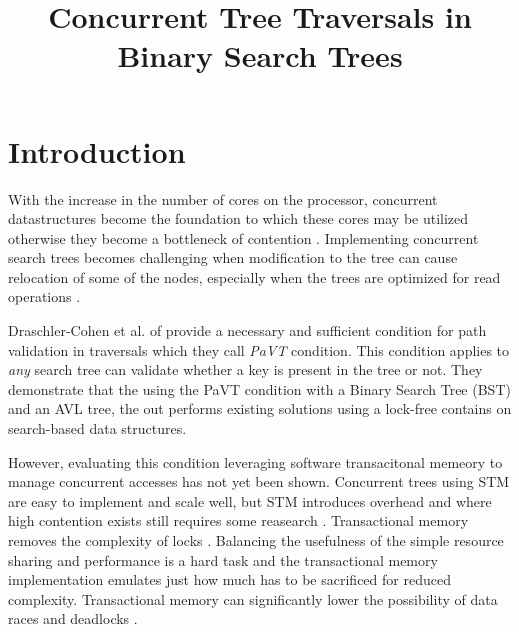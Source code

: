 \documentclass[conference]{IEEEtran}
\theoremstyle{definition}
\theoremstyle{theorem}
\begin{document}
\title{Concurrent Tree Traversals in Binary Search Trees\\
}

\author{
\and
{}
}

\maketitle

\begin{abstract}

\end{abstract}

\section{Introduction}
With the increase in the number of cores on the processor, concurrent datastructures become the foundation to which these cores may be utilized otherwise they become a bottleneck of contention \cite{crain-cont}. Implementing concurrent search trees becomes challenging when modification to the tree can cause relocation of some of the nodes, especially when the trees are optimized for read operations \cite{pavt}.

Draschler-Cohen et al. of \cite{pavt} provide a necessary and sufficient condition for path validation in traversals which they call \textit{PaVT} condition. This condition applies to \textit{any} search tree can validate whether a key is present in the tree or not. They demonstrate that the using the PaVT condition with a Binary Search Tree (BST) and an AVL tree, the out performs existing solutions using a lock-free contains on search-based data structures.

However, evaluating this condition leveraging software transacitonal memeory to manage concurrent accesses has not yet been shown. Concurrent trees using STM are easy to implement and scale well, but STM introduces overhead and where high contention exists still requires some reasearch \cite{bron}. Transactional memory removes the complexity of locks \cite{b4}. Balancing the usefulness of the simple resource sharing and performance is a hard task and the transactional memory implementation emulates just how much has to be sacrificed for reduced complexity. Transactional memory can significantly lower the possibility of data races and deadlocks \cite{b4}.
\end{document}
